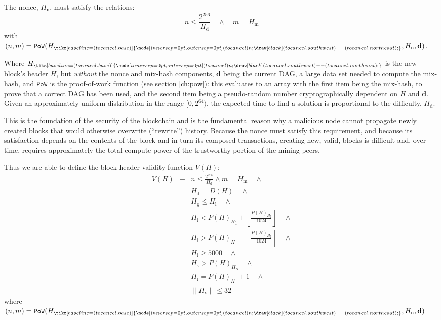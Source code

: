 \documentclass[9pt,oneside]{amsart}
\makeatletter
\newcommand{\linkdest}[1]{\Hy@raisedlink{\hypertarget{#1}{}}}
\newcommand{\hcancel}[1]{%
    \tikz[baseline=(tocancel.base)]{
        \node[inner sep=0pt,outer sep=0pt] (tocancel) {#1};
        \draw[black] (tocancel.south west) -- (tocancel.north east);
    }%
}%
\makeatother
\begin{document}
\begin{multicols}{2}
The nonce, \linkdest{H__n}\hyperlink{block_nonce_H__n}{$H_{\mathrm{n}}$}, must satisfy the relations:
\begin{equation}
n \leqslant \frac{2^{256}}{H_{\mathrm{d}}} \quad \wedge \quad m = H_{\mathrm{m}}
\end{equation}
with $(n, m) = \mathtt{PoW}(H_{\hcancel{n}}, H_{\mathrm{n}}, \mathbf{d})$.

\hypertarget{block_header_without_nonce_and_mixmash_h__cancel_n}{}\linkdest{H_cancel_n}Where $H_{\hcancel{n}}$ is the new block's header $H$, but \textit{without} the nonce and mix-hash components, $\mathbf{d}$ being the current DAG, a large data set needed to compute the mix-hash, and $\mathtt{PoW}$ is the proof-of-work function (see section \ref{ch:pow}): this evaluates to an array with the first item being the mix-hash, to prove that a correct DAG has been used, and the second item being a pseudo-random number cryptographically dependent on $H$ and $\mathbf{d}$. Given an approximately uniform distribution in the range $[0, 2^{64})$, the expected time to find a solution is proportional to the difficulty, $H_{\mathrm{d}}$.

This is the foundation of the security of the blockchain and is the fundamental reason why a malicious node cannot propagate newly created blocks that would otherwise overwrite (``rewrite'') history. Because the nonce must satisfy this requirement, and because its satisfaction depends on the contents of the block and in turn its composed transactions, creating new, valid, blocks is difficult and, over time, requires approximately the total compute power of the trustworthy portion of the mining peers.

\hypertarget{block_header_validity_function}{}Thus we are able to define the block header validity function $V(H)$:
\begin{eqnarray}
V(H) & \equiv &  n \leqslant \frac{2^{256}}{H_{\mathrm{d}}} \wedge m = H_{\mathrm{m}} \quad \wedge \\
\nonumber & & H_{\mathrm{d}} = D(H) \quad \wedge \\
\nonumber& & H_{\mathrm{g}} \le H_{\mathrm{l}}  \quad \wedge \\
\nonumber& & H_{\mathrm{l}} < {P(H)_{H}}_{\mathrm{l}} + \left\lfloor\frac{{P(H)_{H}}_{\mathrm{l}}}{1024}\right\rfloor  \quad \wedge \\
\nonumber& & H_{\mathrm{l}} > {P(H)_{H}}_{\mathrm{l}} - \left\lfloor\frac{{P(H)_{H}}_{\mathrm{l}}}{1024}\right\rfloor  \quad \wedge \\
\nonumber& & H_{\mathrm{l}} \geqslant 5000  \quad \wedge \\
\nonumber& & H_{\mathrm{s}} > {P(H)_{H}}_{\mathrm{s}} \quad \wedge \\
\nonumber& & H_{\mathrm{i}} = {P(H)_{H}}_{\mathrm{i}} +1 \quad \wedge \\
\nonumber& & \lVert H_{\mathrm{x}} \rVert \le 32
\end{eqnarray}
where $(n, m) = \mathtt{PoW}(H_{\hcancel{n}}, H_{\mathrm{n}}, \mathbf{d})$


\end{multicols}
\end{document}
